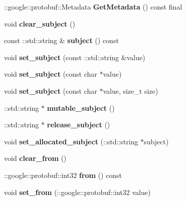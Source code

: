 \begin{DoxyCompactItemize}
\mbox{\label{classtbMessages_1_1EventHeader_abe01d0cbdfc158051aa831db26a067de}} 
\+::google\+::protobuf\+::\+Metadata {\bfseries Get\+Metadata} () const final
\item 
\mbox{\label{classtbMessages_1_1EventHeader_aa90b8b663c76d024a7e8df3d4728e000}} 
void {\bfseries clear\+\_\+subject} ()
\item 
\mbox{\label{classtbMessages_1_1EventHeader_ab69dd04f481ee3f98729168ea40ffccb}} 
const \+::std\+::string \& {\bfseries subject} () const
\item 
\mbox{\label{classtbMessages_1_1EventHeader_aa3c9e507218035d84203a8e52d8d7d84}} 
void {\bfseries set\+\_\+subject} (const \+::std\+::string \&value)
\item 
\mbox{\label{classtbMessages_1_1EventHeader_a8d7ff8cb81d7c78884b13a4c539b2b27}} 
void {\bfseries set\+\_\+subject} (const char $\ast$value)
\item 
\mbox{\label{classtbMessages_1_1EventHeader_a2244e3a9230ca7991b17b95d05b7dcf3}} 
void {\bfseries set\+\_\+subject} (const char $\ast$value, size\+\_\+t size)
\item 
\mbox{\label{classtbMessages_1_1EventHeader_a6bfe11181e0e2271f393df61792784c5}} 
\+::std\+::string $\ast$ {\bfseries mutable\+\_\+subject} ()
\item 
\mbox{\label{classtbMessages_1_1EventHeader_aaf7af283586ca60ce3078060290cb6ee}} 
\+::std\+::string $\ast$ {\bfseries release\+\_\+subject} ()
\item 
\mbox{\label{classtbMessages_1_1EventHeader_a36b1b6bc030d78363ae3308c27963731}} 
void {\bfseries set\+\_\+allocated\+\_\+subject} (\+::std\+::string $\ast$subject)
\item 
\mbox{\label{classtbMessages_1_1EventHeader_a7c723b88f169669dfa027795e70b1281}} 
void {\bfseries clear\+\_\+from} ()
\item 
\mbox{\label{classtbMessages_1_1EventHeader_a69f4664b3d1af4f3a456f811508861e0}} 
\+::google\+::protobuf\+::int32 {\bfseries from} () const
\item 
\mbox{\label{classtbMessages_1_1EventHeader_ac255d0989af7d1eee2c32affaaf7cec4}} 
void {\bfseries set\+\_\+from} (\+::google\+::protobuf\+::int32 value)
\end{DoxyCompactItemize}
